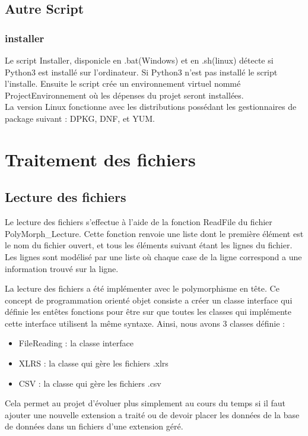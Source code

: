 \subsection{Autre Script}
\subsubsection{installer}
    Le script Installer, disponicle en .bat(Windows) et en .sh(linux) détecte si Python3 est installé sur l'ordinateur. Si Python3 n'est pas installé le script l'installe. Ensuite le script crée un environnement virtuel nommé ProjectEnvironnement où les dépenses du projet seront installées.\\
    La version Linux fonctionne avec les distributions possédant les gestionnaires de package suivant : DPKG, DNF, et YUM.

\section{Traitement des fichiers}

\subsection{Lecture des fichiers}
Le lecture des fichiers s'effectue à l'aide de la fonction ReadFile du fichier PolyMorph\_Lecture.
Cette fonction renvoie une liste dont le première élément est le nom du fichier ouvert, et tous les éléments suivant étant les lignes du fichier. Les lignes sont modélisé par une liste où chaque case de la ligne correspond a une information trouvé sur la ligne.

La lecture des fichiers a été implémenter avec le polymorphisme en tête. Ce concept de programmation orienté objet consiste a créer un classe interface qui définie les entêtes fonctions pour être sur que toutes les classes qui implémente cette interface utilisent la même syntaxe. Ainsi, nous avons 3 classes définie :
\begin{itemize}
    \item FileReading : la classe interface
    \item XLRS : la classe qui gère les fichiers .xlrs
    \item CSV : la classe qui gère les fichiers .csv
\end{itemize}
Cela permet au projet d'évoluer plus simplement au cours du temps si il faut ajouter une nouvelle extension a traité ou de devoir placer les données de la base de données dans un fichiers d'une extension géré.

